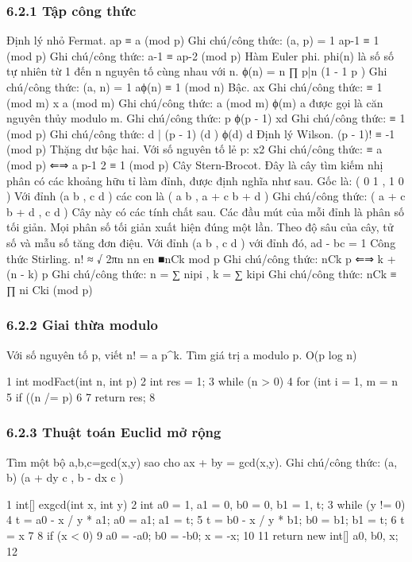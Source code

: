 \documentclass[11pt]{article}
\begin{document}
\subsubsection{6.2.1 Tập công thức}
\begin{NoteBlock}
Định lý nhỏ Fermat.
ap
≡ a (mod p)
Ghi chú/công thức: (a, p) = 1   ap-1
≡ 1 (mod p)
Ghi chú/công thức: a-1
≡ ap-2
(mod p)
Hàm Euler phi.
phi(n) là số số tự nhiên từ 1 đến n nguyên tố cùng nhau với n.
ϕ(n) = n
∏
p|n
(1 -
1
p
)
Ghi chú/công thức: (a, n) = 1   aϕ(n)
≡ 1 (mod n)
Bậc.
ax
Ghi chú/công thức: ≡ 1 (mod m)   x   a (mod m)
Ghi chú/công thức: a (mod m)  ϕ(m)
a được gọi là căn nguyên thủy modulo m.
Ghi chú/công thức: p  ϕ(p - 1)
xd
Ghi chú/công thức: ≡ 1 (mod p)
Ghi chú/công thức: d | (p - 1)   (d  ) ϕ(d)   d
Định lý Wilson.
(p - 1)! ≡ -1 (mod p)
Thặng dư bậc hai.
Với số nguyên tố lẻ p:
x2
Ghi chú/công thức: ≡ a (mod p)   ⇐⇒ a
p-1
2 ≡ 1 (mod p)
Cây Stern-Brocot.
Đây là cây tìm kiếm nhị phân có các khoảng hữu tỉ làm đỉnh, được định nghĩa như sau.
Gốc là:
(
0
1
,
1
0
)
Với đỉnh
(a
b
,
c
d
)
các con là
(
a
b
,
a + c
b + d
)
Ghi chú/công thức: 
(
a + c
b + d
,
c
d
)
Cây này có các tính chất sau.
Các đầu mút của mỗi đỉnh là phân số tối giản.
Mọi phân số tối giản xuất hiện đúng một lần.
Theo độ sâu của cây, tử số và mẫu số tăng đơn điệu.
Với đỉnh
(a
b
,
c
d
)
với đỉnh đó,
ad - bc = 1
Công thức Stirling.
n! ≈
√
2πn
nn
en
■nCk mod p
Ghi chú/công thức: nCk  p   ⇐⇒ k + (n - k)   p
Ghi chú/công thức: n =
∑
nipi
, k =
∑
kipi
Ghi chú/công thức: 
nCk ≡
∏
ni Cki (mod p)
\end{NoteBlock}
\subsubsection{6.2.2 Giai thừa modulo}
\begin{NoteBlock}
Với số nguyên tố p, viết n! = a p^k.
Tìm giá trị a modulo p.
O(p log n)
\end{NoteBlock}
\begin{Code}
1 int modFact(int n, int p) {
2 int res = 1;
3 while (n > 0) {
4 for (int i = 1, m = n %
5 if ((n /= p) %
6 }
7 return res;
8 }
\end{Code}
\subsubsection{6.2.3 Thuật toán Euclid mở rộng}
\begin{NoteBlock}
Tìm một bộ {a,b,c=gcd(x,y)} sao cho ax + by = gcd(x,y).
Ghi chú/công thức: (a, b)   (a + dy
c , b - dx
c )
\end{NoteBlock}
\begin{Code}
1 int[] exgcd(int x, int y) {
2 int a0 = 1, a1 = 0, b0 = 0, b1 = 1, t;
3 while (y != 0) {
4 t = a0 - x / y * a1; a0 = a1; a1 = t;
5 t = b0 - x / y * b1; b0 = b1; b1 = t;
6 t = x %
7 }
8 if (x < 0) {
9 a0 = -a0; b0 = -b0; x = -x;
10 }
11 return new int[] {a0, b0, x};
12 }
\end{Code}
\end{document}
